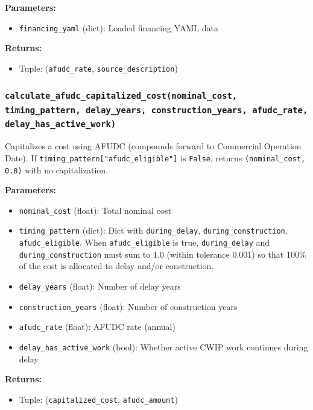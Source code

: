 \documentclass[ctcc_full_documentation.tex]{subfiles}
\begin{document}
\textbf{Parameters:}
\begin{itemize}
    \item \texttt{financing\_yaml} (dict): Loaded financing YAML data
\end{itemize}

\textbf{Returns:}
\begin{itemize}
    \item Tuple: (\texttt{afudc\_rate}, \texttt{source\_description})
\end{itemize}

\subsubsection{\texttt{calculate\_afudc\_capitalized\_cost(nominal\_cost, timing\_pattern, delay\_years, construction\_years, afudc\_rate, delay\_has\_active\_work)}}

Capitalizes a cost using AFUDC (compounds forward to Commercial Operation Date). If \texttt{timing\_pattern["afudc\_eligible"]} is \texttt{False}, returns \texttt{(nominal\_cost, 0.0)} with no capitalization.

\textbf{Parameters:}
\begin{itemize}
    \item \texttt{nominal\_cost} (float): Total nominal cost
    \item \texttt{timing\_pattern} (dict): Dict with \texttt{during\_delay}, \texttt{during\_construction}, \texttt{afudc\_eligible}. When \texttt{afudc\_eligible} is true, \texttt{during\_delay} and \texttt{during\_construction} must sum to 1.0 (within tolerance 0.001) so that 100\% of the cost is allocated to delay and/or construction.
    \item \texttt{delay\_years} (float): Number of delay years
    \item \texttt{construction\_years} (float): Number of construction years
    \item \texttt{afudc\_rate} (float): AFUDC rate (annual)
    \item \texttt{delay\_has\_active\_work} (bool): Whether active CWIP work continues during delay
\end{itemize}

\textbf{Returns:}
\begin{itemize}
    \item Tuple: (\texttt{capitalized\_cost}, \texttt{afudc\_amount})
\end{itemize}
\end{document}
